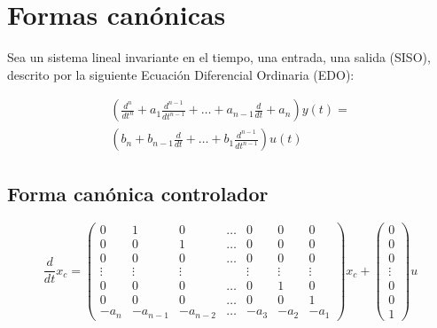 
    \newpage
    \section{Formas canónicas}
        Sea un sistema lineal invariante en el tiempo, una entrada, una salida (SISO), descrito por la siguiente Ecuación Diferencial Ordinaria (EDO):

        \begin{multline}
            \left( \frac{d^n}{dt^n} + a_1 \frac{d^{n-1}}{dt^{n-1}} + \dots + a_{n-1} \frac{d}{dt} + a_n \right) y(t) = \\
            \left( b_n + b_{n-1} \frac{d}{dt} + \dots + b_1 \frac{d^{n-1}}{dt^{n-1}} \right) u(t)
        \end{multline}


        \subsection{Forma canónica controlador}

        \begin{equation}
            \frac{d}{dt} x_c =
            \begin{pmatrix}
            0 & 1 & 0 & \dots & 0 & 0 & 0 \\
            0 & 0 & 1 & \dots & 0 & 0 & 0 \\
            0 & 0 & 0 & \dots & 0 & 0 & 0 \\
            \vdots & \vdots & \vdots & & \vdots & \vdots & \vdots \\
            0 & 0 & 0 & \dots & 0 & 1 & 0 \\
            0 & 0 & 0 & \dots & 0 & 0 & 1 \\
            -a_{n} & -a_{n-1} & -a_{n-2} & \dots & -a_{3} & -a_{2} & -a_{1}
            \end{pmatrix} x_c +
            \begin{pmatrix}
            0 \\
            0 \\
            0 \\
            \vdots \\
            0 \\
            0 \\
            1
            \end{pmatrix} u
        \end{equation}

